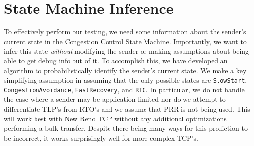 \section{State Machine Inference}
To effectively perform our testing, we need some information about the sender's
current state in the Congestion Control State Machine. Importantly, we want to
infer this state \emph{without} modifying the sender or making assumptions about
being able to get debug info out of it. To accomplish this, we have developed
an algorithm to probabilistically identify the sender's current state. We make
a key simplifying assumption in assuming that the only possible states are
\texttt{SlowStart}, \texttt{CongestionAvoidance}, \texttt{FastRecovery}, and
\texttt{RTO}. In particular, we do not handle the case where a sender may be
application limited nor do we attempt to differentiate TLP's from RTO's and we
assume that PRR is not being used. This will work best with New Reno TCP without
any additional optimizations performing a bulk transfer. Despite there being
many ways for this prediction to be incorrect, it works surprisingly well for
more complex TCP's.

